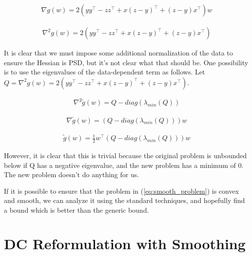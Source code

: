 \documentclass[11pt]{article}
\begin{document}
\begin{equation}
\begin{aligned}
\nabla g(w) = 2(yy^{\top} - zz^{\top} + x(z - y)^{\top} + (z - y)x^{\top})w
\end{aligned}
\end{equation}

\begin{equation}
\begin{aligned}
\nabla^2 g(w) = 2(yy^{\top} - zz^{\top} + x(z - y)^{\top} + (z - y)x^{\top})
\end{aligned}
\end{equation}

It is clear that we must impose some additional normalization of the data to ensure the Hessian is PSD, but it's not clear what that should be. One possibility is to use the eigenvalues of the data-dependent term as follows. Let $Q = \nabla^2 g(w) = 2(yy^{\top} - zz^{\top} + x(z - y)^{\top} + (z - y)x^{\top})$. 

\begin{equation}
\begin{aligned}
\nabla^2 \tilde{g}(w) = Q - diag(\lambda_{min}(Q))
\end{aligned}
\end{equation}

\begin{equation}
\begin{aligned}
\nabla \tilde{g}(w) = (Q - diag(\lambda_{min}(Q)))w
\end{aligned}
\end{equation}

\begin{equation}
\begin{aligned}
\tilde{g}(w) = \frac{1}{2}w^{\top}(Q - diag(\lambda_{min}(Q)))w
\end{aligned}
\end{equation}

However, it is clear that this is trivial because the original problem is unbounded below if Q has a negative eigenvalue, and the new problem has a minimum of 0. The new problem doesn't do anything for us.

If it is possible to ensure that the problem in (\ref{eq:smooth_problem}) is convex and smooth, we can analyze it using the standard techniques, and hopefully find a bound which is better than the generic bound.

\section{DC Reformulation with Smoothing}
\end{document}
